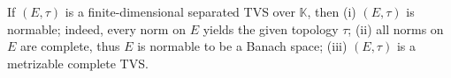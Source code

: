 If $(E, \tau)$ is a finite-dimensional separated TVS over $\mathbb{K}$, then (i) $(E, \tau)$ is normable; indeed, every norm on $E$ yields the given topology $\tau$; (ii) all norms on $E$ are complete, thus $E$ is normable to be a Banach space; (iii) $(E, \tau)$ is a metrizable complete TVS.
